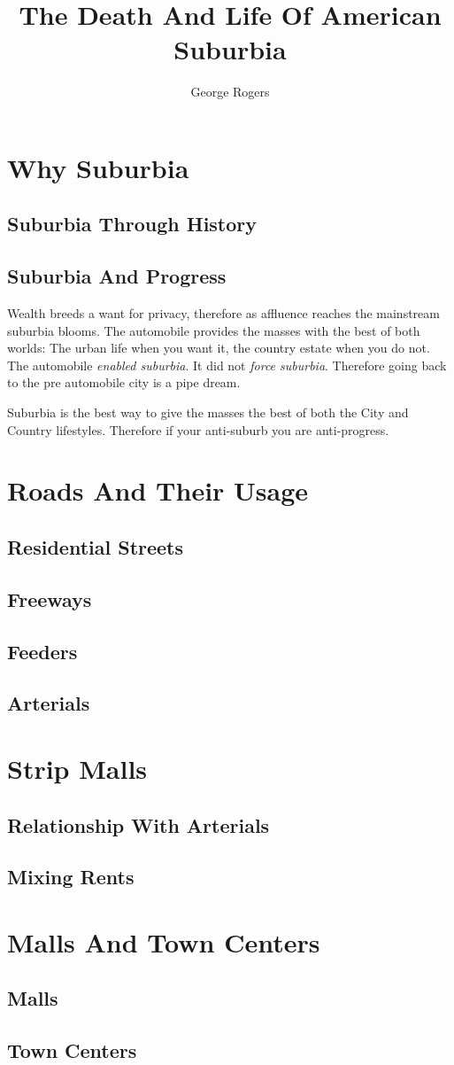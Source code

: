 \documentclass[8pt]{amsbook}
\title{The Death And Life Of American Suburbia}
\author{George Rogers}
\begin{document}
\dominitoc
\maketitle

\tableofcontents

\chapter{Why Suburbia}
\minitoc

\section{Suburbia Through History}
\cite{bruegmann05}

\section{Suburbia And Progress}

Wealth breeds a want for privacy,
therefore as affluence reaches the mainstream suburbia blooms.
The automobile provides the masses with the best of both worlds:
The urban life when you want it, the country estate when you do not.
The automobile \emph{enabled suburbia}. It did not \emph{force suburbia}.
Therefore going back to the pre automobile city is a pipe dream.

Suburbia is the best way to give the masses the best of both the City and Country lifestyles.
Therefore if your anti-suburb you are anti-progress.
\chapter{Roads And Their Usage}
\minitoc
\section{Residential Streets}
\section{Freeways}
\section{Feeders}
\section{Arterials}
\chapter{Strip Malls}
\minitoc
\section{Relationship With Arterials}
\section{Mixing Rents}
\chapter{Malls And Town Centers}
\minitoc
\section{Malls}
\section{Town Centers}

\end{document}
